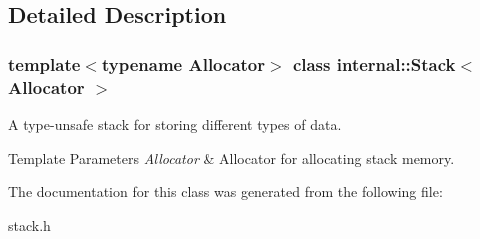 \subsection{Detailed Description}
\subsubsection*{template$<$typename Allocator$>$\newline
class internal\+::\+Stack$<$ Allocator $>$}

A type-\/unsafe stack for storing different types of data. 


\begin{DoxyTemplParams}{Template Parameters}
{\em Allocator} & Allocator for allocating stack memory. \\
\hline
\end{DoxyTemplParams}


The documentation for this class was generated from the following file\+:\begin{DoxyCompactItemize}
\item 
stack.\+h\end{DoxyCompactItemize}
